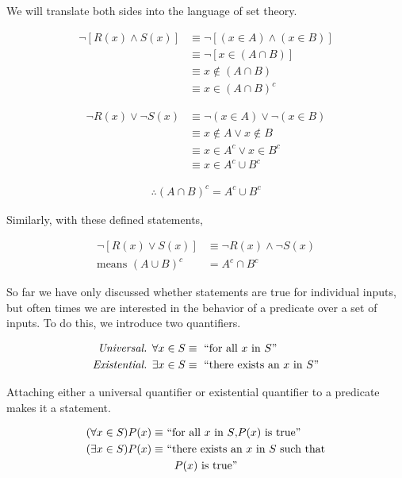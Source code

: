 We will translate both sides into the language of set theory.
 
\begin{align*}
	\neg[R(x) \wedge S(x)] &\equiv \neg[(x \in A) \wedge (x \in B)] \\
	&\equiv \neg[x \in (A \cap B)] \\
	&\equiv x \notin (A \cap B) \\
	&\equiv x \in (A \cap B)^c
\end{align*}

\begin{align*}
	\neg R(x) \lor \neg S(x) &\equiv \neg(x \in A) \lor \neg(x \in B) \\
	&\equiv x \notin A \lor x \notin B \\
	&\equiv x \in A^c \lor x \in B^c \\
	&\equiv x \in A^c \cup B^c
\end{align*}

\begin{align*}
	\therefore (A \cap B)^c = A^c \cup B^c
\end{align*}

Similarly, with these defined statements,

\begin{align*}
	\neg[R(x) \lor S(x)] &\equiv \neg R(x) \wedge \neg S(x) \\
	\text{means } (A \cup B)^c &= A^c \cap B^c
\end{align*}

So far we have only discussed whether statements are true for individual inputs, but often times we are interested in the behavior of a predicate over a set of inputs. To do this, we introduce two quantifiers.

\begin{align*}
	\emph{Universal. } \forall x \in S &\equiv \text{ ``for all $x$ in $S$''} \\
	\emph{Existential. } \exists x \in S &\equiv \text{ ``there exists an $x$ in $S$''}
\end{align*}

Attaching either a universal quantifier or existential quantifier to a predicate makes it a statement.

\begin{align*}
	(\forall x \in S)P(x) \equiv &\text{ ``for all $x$ in $S$,$P(x)$ is true''} \\
	(\exists x \in S)P(x) \equiv &\text{ ``there exists an $x$ in $S$ such that} \\
	& \text{\quad $P(x)$ is true''}
\end{align*}

